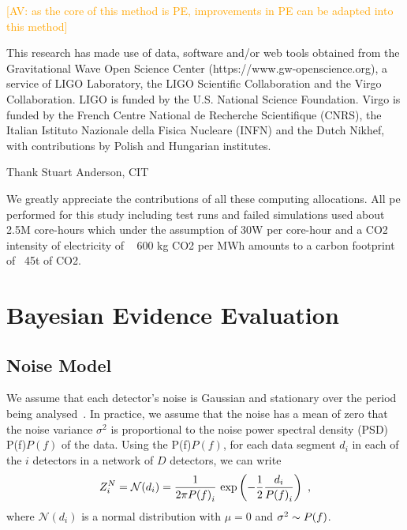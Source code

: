 \documentclass[%
 nofootinbib,
 amsmath,amssymb,
 aps,
 twocolumn
]{revtex4-2}
\newcommand{\mathcmd}[1]{{\sc \relax\ifmmode#1\else $#1$\fi}\xspace}
\newcommand{\psd}{\mathcmd{P(f)}}
\newcommand{\avi}[1]{\textcolor{orange}{[AV: #1]}}
\begin{document}
\avi{as the core of this method is PE, improvements in PE can be adapted into this method}


\begin{acknowledgments}

This research has made use of data, software and/or web tools obtained from the Gravitational Wave Open Science Center (https://www.gw-openscience.org), a service of LIGO Laboratory, the LIGO Scientific Collaboration and the Virgo Collaboration. LIGO is funded by the U.S. National Science Foundation. Virgo is funded by the French Centre National de Recherche Scientifique (CNRS), the Italian Istituto Nazionale della Fisica Nucleare (INFN) and the Dutch Nikhef, with contributions by Polish and Hungarian institutes.

Thank Stuart Anderson, CIT

 We greatly appreciate the contributions of all these computing allocations. All pe performed for this study including test runs and failed simulations used about 2.5M core-hours which under the assumption of 30W per core-hour and a CO2 intensity of electricity of ~ 600 kg CO2 per MWh amounts to a carbon footprint of~ 45t of CO2. 



\end{acknowledgments}

\appendix



\section{Bayesian Evidence Evaluation}\label{sec:bayesianEvidEval}
\subsection{Noise Model}
We assume that each detector's noise is Gaussian and stationary over the period being analysed~\cite{ligo_psd}. In practice, we assume that the noise has a mean of zero that the noise variance $\sigma^2$ is proportional to the noise power spectral density (PSD) \psd of the data. Using the \psd, for each data segment $d_i$ in each of the $i$ detectors in a network of $D$ detectors, we can write 
\begin{equation}
\label{eq:zn}
Z^N_i = \mathcal{N}(d_i) = \frac{1}{2\pi \psd_i} \ \text{exp}\left(-\frac{1}{2} \frac{d_i}{\psd_i} \right) \ ,
\end{equation}
where $\mathcal{N}(d_i)$ is a normal distribution with $\mu=0$ and $\sigma^2\sim \psd$. 
\end{document}
